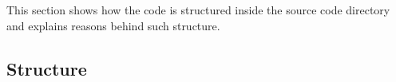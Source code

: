This section shows how the code is structured inside the source code directory and explains reasons behind such structure.

\subsection{Structure}
